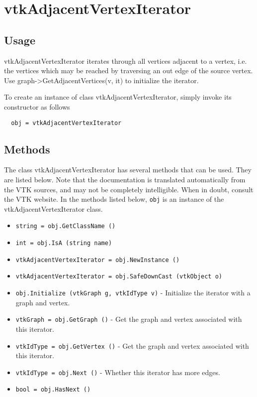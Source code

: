 \section{vtkAdjacentVertexIterator}

\subsection{Usage}

 vtkAdjacentVertexIterator iterates through all vertices adjacent to a
 vertex, i.e. the vertices which may be reached by traversing an out edge
 of the source vertex. Use graph->GetAdjacentVertices(v, it) to initialize
 the iterator.


To create an instance of class vtkAdjacentVertexIterator, simply
invoke its constructor as follows
\begin{verbatim}
  obj = vtkAdjacentVertexIterator
\end{verbatim}
\subsection{Methods}

The class vtkAdjacentVertexIterator has several methods that can be used.
  They are listed below.
Note that the documentation is translated automatically from the VTK sources,
and may not be completely intelligible.  When in doubt, consult the VTK website.
In the methods listed below, \verb|obj| is an instance of the vtkAdjacentVertexIterator class.
\begin{itemize}
\item  \verb|string = obj.GetClassName ()|

\item  \verb|int = obj.IsA (string name)|

\item  \verb|vtkAdjacentVertexIterator = obj.NewInstance ()|

\item  \verb|vtkAdjacentVertexIterator = obj.SafeDownCast (vtkObject o)|

\item  \verb|obj.Initialize (vtkGraph g, vtkIdType v)| -  Initialize the iterator with a graph and vertex.

\item  \verb|vtkGraph = obj.GetGraph ()| -  Get the graph and vertex associated with this iterator.

\item  \verb|vtkIdType = obj.GetVertex ()| -  Get the graph and vertex associated with this iterator.

\item  \verb|vtkIdType = obj.Next ()| -  Whether this iterator has more edges.

\item  \verb|bool = obj.HasNext ()|

\end{itemize}
